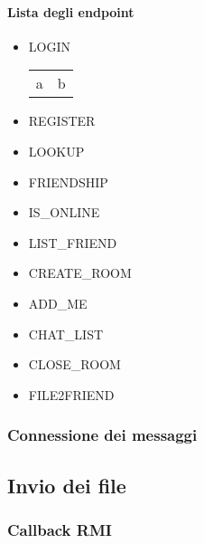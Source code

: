 \medskip
\paragraph{Lista degli endpoint}
\begin{itemize}
    \item LOGIN
    \begin{tabular}{l | r}
        a & b
    \end{tabular}
    
    \item REGISTER

    \item LOOKUP

    \item FRIENDSHIP

    \item IS\_ONLINE

    \item LIST\_FRIEND

    \item CREATE\_ROOM

    \item ADD\_ME

    \item CHAT\_LIST

    \item CLOSE\_ROOM

    \item FILE2FRIEND
\end{itemize}

\subsubsection{Connessione dei messaggi}

\subsection{Invio dei file}


\subsubsection{Callback RMI}